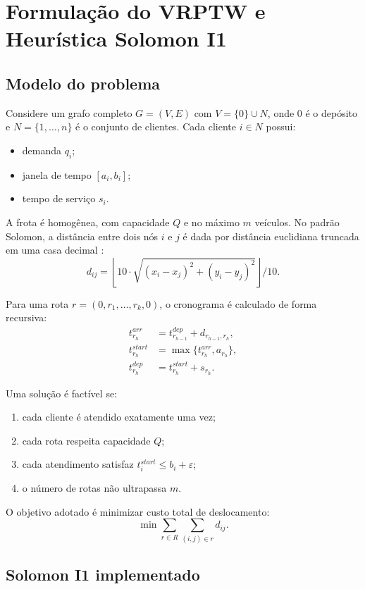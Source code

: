 \section{Formulação do VRPTW e Heurística Solomon I1}
\label{sec:vrptw_i1}

\subsection{Modelo do problema}

Considere um grafo completo $G=(V,E)$ com $V=\{0\}\cup N$, onde $0$ é o depósito e
$N=\{1,\ldots,n\}$ é o conjunto de clientes.
Cada cliente $i\in N$ possui:
\begin{itemize}
  \item demanda $q_i$;
  \item janela de tempo $[a_i,b_i]$;
  \item tempo de serviço $s_i$.
\end{itemize}

A frota é homogênea, com capacidade $Q$ e no máximo $m$ veículos.
No padrão Solomon, a distância entre dois nós $i$ e $j$ é dada por distância euclidiana truncada em uma casa decimal \cite{solomon1987algorithms}:
\[
 d_{ij}=\left\lfloor 10\cdot \sqrt{(x_i-x_j)^2+(y_i-y_j)^2}\right\rfloor/10.
\]

Para uma rota $r=(0,r_1,\ldots,r_k,0)$, o cronograma é calculado de forma recursiva:
\begin{align}
 t^{arr}_{r_h} &= t^{dep}_{r_{h-1}} + d_{r_{h-1},r_h}, \\
 t^{start}_{r_h} &= \max\{t^{arr}_{r_h}, a_{r_h}\}, \\
 t^{dep}_{r_h} &= t^{start}_{r_h} + s_{r_h}.
\end{align}

Uma solução é factível se:
\begin{enumerate}
  \item cada cliente é atendido exatamente uma vez;
  \item cada rota respeita capacidade $Q$;
  \item cada atendimento satisfaz $t^{start}_i \le b_i + \varepsilon$;
  \item o número de rotas não ultrapassa $m$.
\end{enumerate}

O objetivo adotado é minimizar custo total de deslocamento:
\[
 \min \sum_{r\in R}\sum_{(i,j)\in r} d_{ij}.
\]

\subsection{Solomon I1 implementado}
\label{subsec:solomon_i1_impl}

